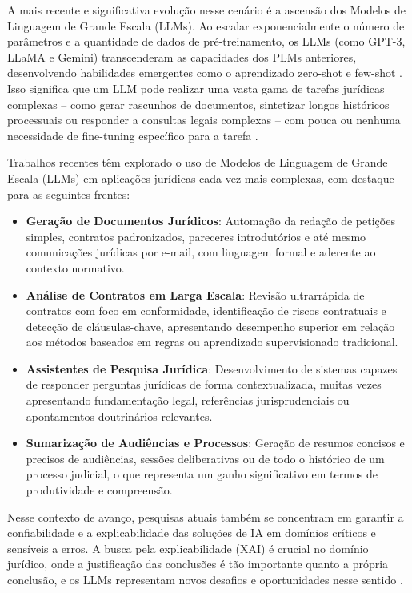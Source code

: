 A mais recente e significativa evolução nesse cenário é a ascensão dos Modelos de Linguagem de Grande Escala (LLMs). Ao escalar exponencialmente o número de parâmetros e a quantidade de dados de pré-treinamento, os LLMs (como GPT-3, LLaMA e Gemini) transcenderam as capacidades dos PLMs anteriores, desenvolvendo habilidades emergentes como o aprendizado zero-shot e few-shot \cite{brown_language_2020, wei_emergent_2022}. Isso significa que um LLM pode realizar uma vasta gama de tarefas jurídicas complexas – como gerar rascunhos de documentos, sintetizar longos históricos processuais ou responder a consultas legais complexas – com pouca ou nenhuma necessidade de fine-tuning específico para a tarefa \cite{katz_natural_2023}.

Trabalhos recentes têm explorado o uso de Modelos de Linguagem de Grande Escala (LLMs) em aplicações jurídicas cada vez mais complexas, com destaque para as seguintes frentes:

\begin{itemize}
    \item \textbf{Geração de Documentos Jurídicos}: Automação da redação de petições simples, contratos padronizados, pareceres introdutórios e até mesmo comunicações jurídicas por e-mail, com linguagem formal e aderente ao contexto normativo.
    
    \item \textbf{Análise de Contratos em Larga Escala}: Revisão ultrarrápida de contratos com foco em conformidade, identificação de riscos contratuais e detecção de cláusulas-chave, apresentando desempenho superior em relação aos métodos baseados em regras ou aprendizado supervisionado tradicional.
    
    \item \textbf{Assistentes de Pesquisa Jurídica}: Desenvolvimento de sistemas capazes de responder perguntas jurídicas de forma contextualizada, muitas vezes apresentando fundamentação legal, referências jurisprudenciais ou apontamentos doutrinários relevantes.
    
    \item \textbf{Sumarização de Audiências e Processos}: Geração de resumos concisos e precisos de audiências, sessões deliberativas ou de todo o histórico de um processo judicial, o que representa um ganho significativo em termos de produtividade e compreensão.
\end{itemize}

Nesse contexto de avanço, pesquisas atuais também se concentram em garantir a confiabilidade e a explicabilidade das soluções de IA em domínios críticos e sensíveis a erros. A busca pela explicabilidade (XAI) é crucial no domínio jurídico, onde a justificação das conclusões é tão importante quanto a própria conclusão, e os LLMs representam novos desafios e oportunidades nesse sentido \cite{mahoney_framework_2019, katz_natural_2023}.

